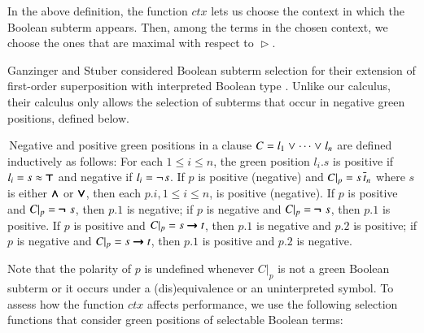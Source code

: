 In the above definition, the function $\mathit{ctx}$ lets
us choose the context in which the Boolean subterm appears. Then, among
the terms in the chosen context, we choose the ones that are maximal with
respect to $\vartriangleright$.

Ganzinger and Stuber considered Boolean subterm selection for their extension of
first-order superposition with interpreted Boolean type \cite{gs-05-boolsup}. Unlike our calculus, their calculus
only allows the selection of subterms that occur in negative green positions, defined below.

\begin{defi}
 \,Negative and positive green positions in a clause $C = l_1 \mathrel\lor \cdots \mathrel\lor
 l_n$ are defined inductively as follows: For each
 $1 \leq i \leq n$, the green position $l_i.s$ is positive if $l_i = s \approx \pmb{\top}$ and negative if $l_i
 = \neg{\kern.2ex s}$. If $p$ is positive (negative) and $C|_p = s \,
 \overline{t}_{n}$ where $s$ is either $\pmb{\land}$ or $\pmb{\lor}$, then each
 $p.i, 1 \leq i \leq n$, is positive (negative). If $p$ is positive and $C|_p =
 \pmb{\neg\,} \, s$, then $p.1$ is negative; if $p$ is negative and $C|_p = \pmb{\neg\,} \, s$,
 then $p.1$ is positive. If $p$ is positive and $C|_p = s \pmb{\rightarrow} t$, then
 $p.1$ is negative and $p.2$ is positive; if $p$ is negative and $C|_p = s
 \pmb{\rightarrow} t$, then $p.1$ is positive and $p.2$ is negative.
\end{defi}
Note that the polarity of $p$ is undefined whenever $C|_p$ is not a green Boolean subterm
or it occurs under a (dis)equivalence or an uninterpreted symbol.
To assess how the function $\mathit{ctx}$ affects performance, we use the following
selection functions that consider green positions of selectable Boolean terms:
%

